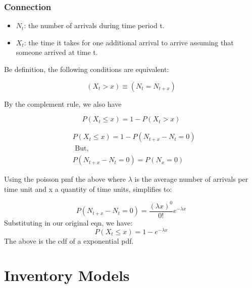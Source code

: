 \documentclass[a4]{article}
\begin{document}
\subsubsection{Connection}
\begin{itemize}
	\item $N_{t}$: the number of arrivals during time period t. 
	\item $X_{t}$: the time it takes for one additional arrival to arrive assuming that someone arrived at time t.
\end{itemize}
Be definition, the following conditions are equivalent:\par 
$$
\left(X_{t}>x\right) \equiv\left(N_{t}=N_{t+x}\right)
$$\par 
By the complement rule, we also have\par 
$$
P\left(X_{t} \leq x\right)=1-P\left(X_{t}>x\right)
$$\par 
$$
\begin{aligned}
&P\left(X_{t} \leq x\right)=1-P\left(N_{t+x}-N_{t}=0\right)\\
&\text { But, }\\
&P\left(N_{t+x}-N_{t}=0\right)=P\left(N_{x}=0\right)
\end{aligned}
$$\par 
Using the poisson pmf the above where $\lambda$ is the average number of arrivals per time unit and x a quantity of time units, simplifies to: \par 
$$
P\left(N_{t+x}-N_{t}=0\right)=\frac{(\lambda x)^{0}}{0 !} e^{-\lambda x}
$$
Substituting in our original eqn, we have:
$$
P\left(X_{t} \leq x\right)=1-e^{-\lambda x}
$$
The above is the cdf of a exponential pdf.
\section{Inventory Models}
\end{document}
